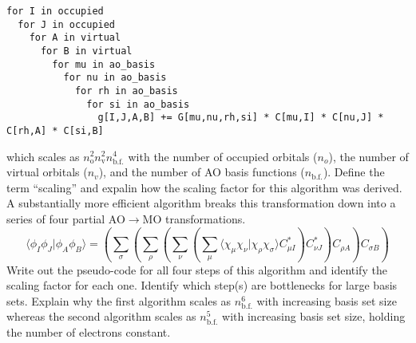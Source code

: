 \documentclass[11pt]{article}
\newcommand{\si}{\sigma}     %
\newcommand{\f}{\phi}        %
\newcommand{\x}{\chi}        %
\newcommand{\mr}[1]{\ensuremath{\mathrm{#1}}}
\newcommand{\pr}[1]{\ensuremath{\left(#1\right)}}
\newcommand{\ip}[1]{\ensuremath{\langle#1\rangle}}
\begin{document}
\begin{enumerate}
\begin{lstlisting}
for I in occupied
  for J in occupied
    for A in virtual
      for B in virtual
        for mu in ao_basis
          for nu in ao_basis
            for rh in ao_basis
              for si in ao_basis
                g[I,J,A,B] += G[mu,nu,rh,si] * C[mu,I] * C[nu,J] * C[rh,A] * C[si,B]
\end{lstlisting}
  which scales as $n_{\mr{o}}^2n_{\mr{v}}^2n_{\mr{b.f.}}^4$ with the number of occupied orbitals ($n_o$), the number of virtual orbitals ($n_v$), and the number of AO basis functions ($n_{\mr{b.f.}}$).
  Define the term ``scaling'' and expalin how the scaling factor for this algorithm was derived.\\
  A substantially more efficient algorithm breaks this transformation down into a series of four partial AO$\rightarrow$MO transformations.
\begin{equation}
  \ip{\f_I\f_J|\f_A\f_B}
=
  \pr{
    \sum_\si
    \pr{
      \sum_\rho
      \pr{
        \sum_\nu
        \pr{
          \sum_\mu
          \ip{\x_\mu\x_\nu|\x_\rho\x_\si}
          C_{\mu I}^*
        }
        C_{\nu J}^*
      }
      C_{\rho A}
    } 
    C_{\si B}
  }
\end{equation}
  Write out the pseudo-code for all four steps of this algorithm and identify the scaling factor for each one.
  Identify which step(s) are bottlenecks for large basis sets.
  Explain why the first algorithm scales as $n_{\mr{b.f.}}^6$ with increasing basis set size whereas the second algorithm scales as $n_{\mr{b.f.}}^5$ with increasing basis set size, holding the number of electrons constant.


\end{enumerate}
\end{document}
